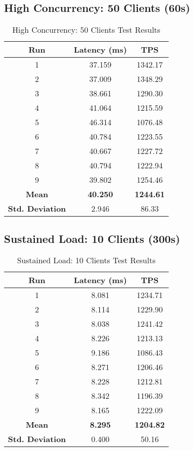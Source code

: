 \subsection{High Concurrency: 50 Clients (60s)}
\begin{table}[H]
\centering
\begin{tabular}{|c|c|c|}
\hline
\textbf{Run} & \textbf{Latency (ms)} & \textbf{TPS} \\
\hline
1 & 37.159 & 1342.17 \\
2 & 37.009 & 1348.29 \\
3 & 38.661 & 1290.30 \\
4 & 41.064 & 1215.59 \\
5 & 46.314 & 1076.48 \\
6 & 40.784 & 1223.55 \\
7 & 40.667 & 1227.72 \\
8 & 40.794 & 1222.94 \\
9 & 39.802 & 1254.46 \\
\hline
\textbf{Mean} & \textbf{40.250} & \textbf{1244.61} \\
\textbf{Std. Deviation} & 2.946 & 86.33 \\
\hline
\end{tabular}
\caption{High Concurrency: 50 Clients Test Results}
\end{table}

\subsection{Sustained Load: 10 Clients (300s)}
\begin{table}[H]
\centering
\begin{tabular}{|c|c|c|}
\hline
\textbf{Run} & \textbf{Latency (ms)} & \textbf{TPS} \\
\hline
1 & 8.081 & 1234.71 \\
2 & 8.114 & 1229.90 \\
3 & 8.038 & 1241.42 \\
4 & 8.226 & 1213.13 \\
5 & 9.186 & 1086.43 \\
6 & 8.271 & 1206.46 \\
7 & 8.228 & 1212.81 \\
8 & 8.342 & 1196.39 \\
9 & 8.165 & 1222.09 \\
\hline
\textbf{Mean} & \textbf{8.295} & \textbf{1204.82} \\
\textbf{Std. Deviation} & 0.400 & 50.16 \\
\hline
\end{tabular}
\caption{Sustained Load: 10 Clients Test Results}
\end{table}

